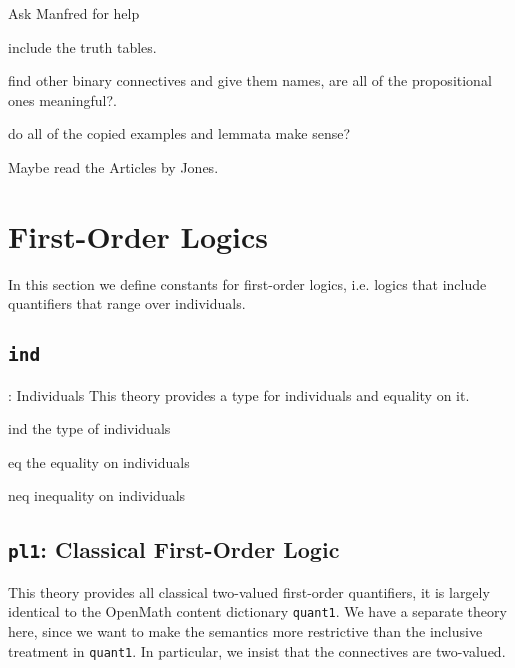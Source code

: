 \documentclass{article}
\def\openmath{{\sc OpenMath}}
\begin{document}
\begin{todolist}{Ask Manfred for help}
  \item include the truth tables.
  \item find other binary connectives and give them names, are all of the
    propositional ones meaningful?. 
  \item do all of the copied examples and lemmata make sense?
  \item Maybe read the Articles by Jones.
\end{todolist}

\section{First-Order Logics}
In this section we define constants for first-order logics, i.e. logics that
include quantifiers that range over individuals.

\subsection{{\tt{ind}}}: Individuals
This theory provides a type for individuals and equality on it. 

\begin{constlist}
  \item[ind] the type of individuals
  \item[eq] the equality on individuals
  \item[neq] inequality on individuals
\end{constlist}

\subsection{{\tt{pl1}}: Classical First-Order Logic}
This theory provides all classical two-valued first-order quantifiers, it is
largely identical to the {\openmath} content dictionary {\tt{quant1}}. We have a
separate theory here, since we want to make the semantics more restrictive than
the inclusive treatment in {\tt{quant1}}. In particular, we insist that the
connectives are two-valued.
\end{document}
